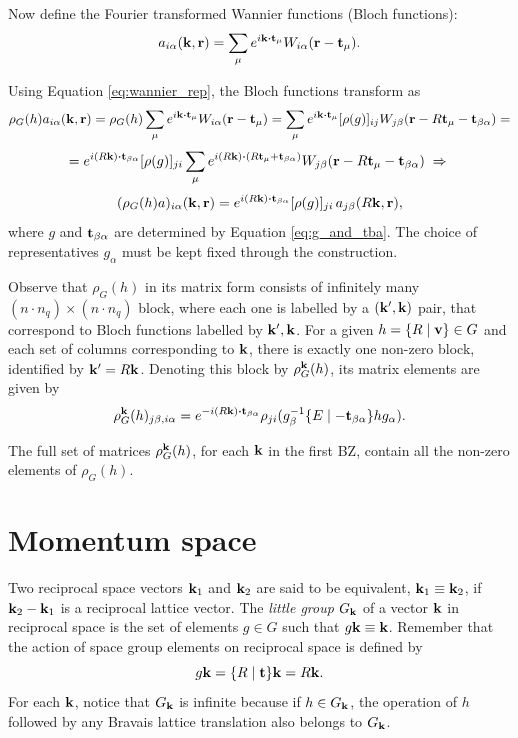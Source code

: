 \n

Now define the Fourier transformed Wannier functions (Bloch functions):
$$
a_{i\alpha}(\k, \r) = \sum_{\mu} e^{i\k\vdot\t_\mu} W_{i\alpha}(\r-\t_\mu).
$$

Using Equation \ref{eq:wannier_rep}, the Bloch functions transform as
$$
\rho_G(h) a_{i\alpha}(\k,\r) =
\rho_G(h) \sum_{\mu} e^{i\k\vdot\t_\mu} W_{i\alpha}(\r-\t_\mu) =
\sum_{\mu} e^{i\k\vdot\t_\mu} [\rho(g)]_{ij} W_{j\beta}(\r-R\t_\mu-\t_{\beta\alpha}) =
$$
$$
= e^{i(R\k)\vdot\t_{\beta\alpha}} [\rho(g)]_{ji} \sum_{\mu} e^{i(R\k)\vdot(R\t_\mu+\t_{\beta\alpha})} W_{j\beta}(\r-R\t_\mu-\t_{\beta\alpha}) \implies
$$
\begin{equation} \label{eq:bloch_rep}
(\rho_G(h) a)_{i\alpha}(\k,\r) = e^{i(R\k)\vdot\t_{\beta\alpha}} [\rho(g)]_{ji} \, a_{j\beta}(R\k, \r),
\end{equation}
where $g$ and ${\vb{t}}_{\beta\alpha}$ are determined by Equation \ref{eq:g_and_tba}. The choice of representatives $g_\alpha$ must be kept fixed through the construction.

Observe that $\rho_G(h)$ in its matrix form consists of infinitely many $(n\cdot n_q)\times (n\cdot n_q)$ block, where each one is labelled by a $({\vb{k}}', {\vb{k}})$ pair, that correspond to Bloch functions labelled by ${\vb{k}}', {\vb{k}}$. For a given $h = \{ R \mid {\vb{v}} \} \in G$ and each set of columns corresponding to ${\vb{k}}$, there is exactly one non-zero block, identified by ${\vb{k}}' = R{\vb{k}}$. Denoting this block by $\rho_G^{\vb{k}}(h)$, its matrix elements are given by
$$
\rho_G^\k(h)_{j\beta,i\alpha} = e^{-i(R\k)\vdot\t_{\beta\alpha}}\rho_{ji}(g_\beta^{-1}\sg{E}{-\t_{\beta\alpha}}hg_\alpha).
$$

The full set of matrices $\rho_G^{\vb{k}}(h)$, for each ${\vb{k}}$ in the first BZ, contain all the non-zero elements of $\rho_G(h)$.

\section{Momentum space}

\begin{definition}
Two reciprocal space vectors ${\vb{k}}_1$ and ${\vb{k}}_2$ are said to be equivalent, ${\vb{k}}_1 \equiv {\vb{k}}_2$, if ${\vb{k}}_2 - {\vb{k}}_1$ is a reciprocal lattice vector. The \textit{little group} $G_{\vb{k}}$ of a vector ${\vb{k}}$ in reciprocal space is the set of elements $g \in G$ such that $g {\vb{k}} \equiv {\vb{k}}$. Remember that the action of space group elements on reciprocal space is defined by
$$
g{\vb{k}} = \{ R \mid {\vb{t}} \}{\vb{k}} = R{\vb{k}}.
$$
For each ${\vb{k}}$, notice that $G_{\vb{k}}$ is infinite because if $h \in G_{\vb{k}}$, the operation of $h$ followed by any Bravais lattice translation also belongs to $G_{\vb{k}}$.
\end{definition}

